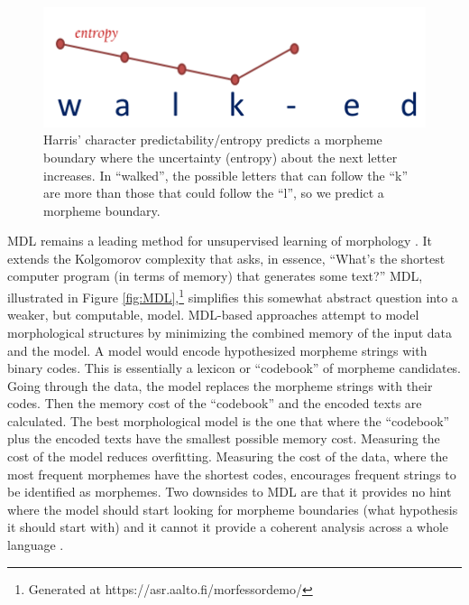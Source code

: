 \documentclass[12pt]{article}
\begin{document}
\begin{figure}[h]
\begin{center}
\includegraphics[width=0.5\columnwidth]{Harris-Entropy-image.PNG}
\caption{Harris' character predictability/entropy predicts a morpheme boundary where the uncertainty (entropy) about the next letter increases. In ``walked'', the possible letters that can follow the ``k'' are more than those that could follow the ``l'', so we predict a morpheme boundary.}
\label{fig:harris}
\end{center}
\end{figure}

MDL remains a leading method for unsupervised learning of morphology \cite{hammarstrom_unsupervised_2011}. It extends the Kolgomorov complexity that asks, in essence, ``What's the shortest computer program (in terms of memory) that generates some text?'' MDL, illustrated in Figure \ref{fig:MDL},\footnote{Generated at https://asr.aalto.fi/morfessordemo/} simplifies this somewhat abstract question into a weaker, but computable, model. MDL-based approaches attempt to model morphological structures by minimizing the combined memory of the input data and the model. A model would encode hypothesized morpheme strings with binary codes. This is essentially a lexicon or ``codebook'' of morpheme candidates. Going through the data, the model replaces the morpheme strings with their codes. Then the memory cost of the ``codebook'' and the encoded texts are calculated. The best morphological model is the one that where the ``codebook'' plus the encoded texts have the smallest possible memory cost. Measuring the cost of the model reduces overfitting. Measuring the cost of the data, where the most frequent morphemes have the shortest codes, encourages frequent strings to be identified as morphemes. Two downsides to MDL are that it provides no hint where the model should start looking for morpheme boundaries (what hypothesis it should start with) and it cannot it provide a coherent analysis across a whole language \cite{goldsmith_computational_2017}.
\end{document}

